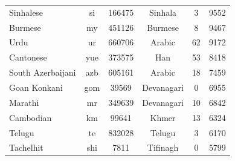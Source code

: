 \documentclass[11pt]{article}
\begin{document}
\begin{table}[ht]
\begin{tabular}{l c c c c c}
        Sinhalese & si & 166475 & Sinhala & 3 & 9552 \\
        Burmese & my & 451126 & Burmese & 8 & 9467 \\
        Urdu & ur & 660706 & Arabic & 62 & 9172 \\
        Cantonese & yue & 373575 & Han & 53 & 8418 \\
        South Azerbaijani & azb & 605161 & Arabic & 18 & 7459 \\
        Goan Konkani & gom & 39569 & Devanagari & 0 & 6955 \\
        Marathi & mr & 349639 & Devanagari & 10 & 6842 \\
        Cambodian & km & 99641 & Khmer & 13 & 6324 \\
        Telugu & te & 832028 & Telugu & 3 & 6170 \\
        Tachelhit & shi & 7811 & Tifinagh & 0 & 5799 \\
        \bottomrule
    \end{tabular}
\end{table}
\end{document}
